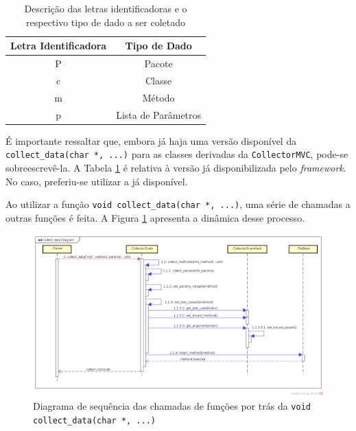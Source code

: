 \begin{table}[h]
\centering
\caption{Descrição das letras identificadoras e o respectivo tipo de dado a ser coletado}
\label{reference-format-collect-data}
\begin{tabular}{@{}cc@{}}
\toprule
\textbf{Letra Identificadora} & \textbf{Tipo de Dado}        \\ \toprule
P                             & Pacote                       \\ \hline
c                             & Classe                       \\ \hline
m                             & Método                       \\ \hline
p                             & Lista de Parâmetros          \\ \hline
\end{tabular}
\end{table}

É importante ressaltar que, embora já haja uma versão disponível da
\lstinline|collect_data(char *, ...)| para as classes derivadas da
\lstinline|CollectorMVC|, pode-se sobreescrevê-la. A Tabela
\ref{reference-format-collect-data} é relativa à versão já disponibilizada
pelo \textit{framework}. No caso, preferiu-se utilizar a já disponível.

Ao utilizar a função \lstinline|void collect_data(char *, ...)|, uma série
de chamadas a outras funções é feita. A Figura \ref{collect-data-sequence-diagram}
apresenta a dinâmica desse processo.
\begin{landscape}
\begin{figure}[h]
  \centering
    \includegraphics[width=1.5\textwidth]{figuras/collect-data-sequence-diagram.png}
    \caption{Diagrama de sequência das chamadas de funções por trás da \lstinline|void collect_data(char *, ...)|}
    \label{collect-data-sequence-diagram}
\end{figure}
\FloatBarrier
\end{landscape}

